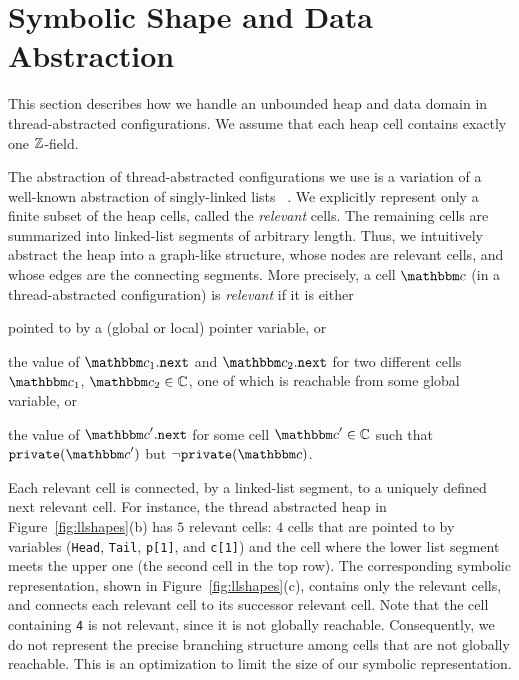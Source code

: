\section{Symbolic Shape and Data Abstraction}
\label{sec:annotations}
This section describes how we handle an
unbounded heap and data domain in
thread-abstracted configurations.
We assume that each heap cell contains exactly one ${\mathbb Z}$-field.

The abstraction of thread-abstracted configurations we use is a variation of a
  well-known abstraction of singly-linked lists ~\cite{MYRS:Canonical}. We explicitly represent only a finite subset of the heap cells, called
the {\em relevant} cells. The remaining
cells are summarized into linked-list segments of arbitrary length.
Thus, we intuitively abstract the heap into a graph-like  structure, whose
nodes are relevant cells, and whose edges are the connecting segments.
More precisely, 
a cell $\cell$ (in a thread-abstracted configuration) is {\em relevant}
if it is either
\begin{inparaenum}[(i)]
\item
pointed to by a (global or local) pointer variable, or
\item
the value of
${\cell_1.{\tt next}}$ and  ${\cell_2.{\tt next}}$ for
two different cells $\cell_1$, $\cell_2 \in \cellset$,
one of which is reachable from some global variable, or
\item the value of ${\cell'.{\tt next}}$ for some cell $\cell' \in \cellset$
  such that $\private(\cell')$ but $\neg \private(\cell)$.
\end{inparaenum}
Each relevant cell is connected, by a linked-list segment, to a uniquely
defined next relevant cell.
For instance, the thread abstracted
heap in Figure~\ref{fig:llshapes}(b) has $5$ relevant
cells: $4$ cells that are pointed to by variables
({\tt Head}, {\tt Tail}, {\tt p[1]}, and {\tt c[1]}) and the cell where
the lower list segment meets the upper one (the second cell in the top row).
The corresponding symbolic representation, shown 
in Figure~\ref{fig:llshapes}(c), contains only the relevant cells, and
connects each relevant cell to its successor relevant cell. 
Note that the cell containing {\tt 4} is not relevant,
since it is not globally reachable.
Consequently,
we do not represent the precise branching structure among cells that
are not globally reachable. This is an optimization to limit the
size of our symbolic representation.

